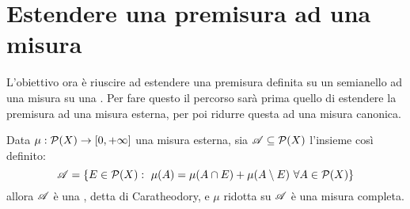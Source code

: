 \section{Estendere una premisura ad una misura}
L'obiettivo ora è riuscire ad estendere una premisura definita su un semianello ad una misura su una \sigalg{}. Per fare questo il percorso sarà prima quello di estendere la premisura ad una misura esterna, per poi ridurre questa ad una misura canonica.


\begin{theorem}\label{thm:RiduzionePreCaratheodory}
	Data $\mu:\mathcal P(X)\to [0,+\infty]$ una misura esterna, sia $\mathscr A\subseteq \mathcal P(X)$ l'insieme così definito:
	\begin{equation*}
		\mathscr A=\{E\in\mathcal P(X):\ \mu(A)=\mu(A\cap E)+\mu(A\setminus E)\ \forall A\in \mathcal P(X)\}
	\end{equation*}
	allora $\mathscr A$ è una \sigalg{}, detta \sigalg{} di Caratheodory, e $\mu$ ridotta su $\mathscr A$ è una misura completa.
\end{theorem}

